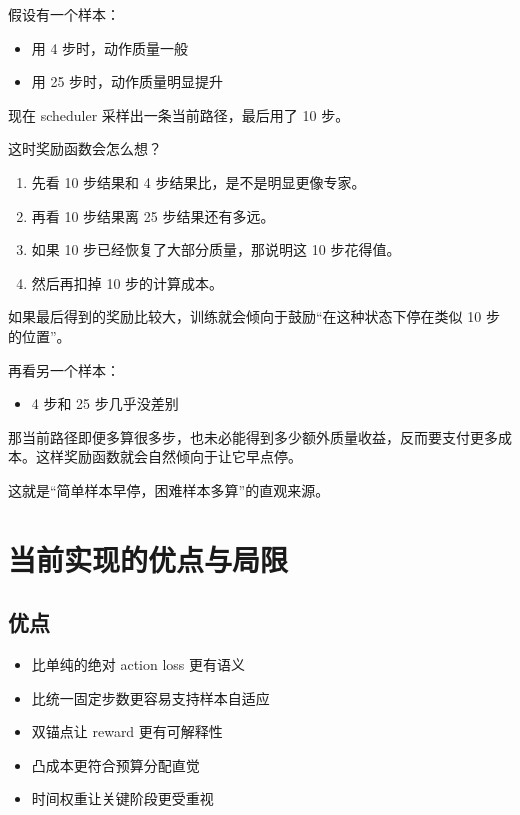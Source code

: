 \documentclass[12pt]{ctexart}
\begin{document}
假设有一个样本：

\begin{itemize}
    \item 用 4 步时，动作质量一般
    \item 用 25 步时，动作质量明显提升
\end{itemize}

现在 scheduler 采样出一条当前路径，最后用了 10 步。

这时奖励函数会怎么想？

\begin{enumerate}
    \item 先看 10 步结果和 4 步结果比，是不是明显更像专家。
    \item 再看 10 步结果离 25 步结果还有多远。
    \item 如果 10 步已经恢复了大部分质量，那说明这 10 步花得值。
    \item 然后再扣掉 10 步的计算成本。
\end{enumerate}

如果最后得到的奖励比较大，训练就会倾向于鼓励“在这种状态下停在类似 10 步的位置”。

再看另一个样本：

\begin{itemize}
    \item 4 步和 25 步几乎没差别
\end{itemize}

那当前路径即便多算很多步，也未必能得到多少额外质量收益，反而要支付更多成本。这样奖励函数就会自然倾向于让它早点停。

这就是“简单样本早停，困难样本多算”的直观来源。

\section{当前实现的优点与局限}

\subsection{优点}

\begin{itemize}
    \item 比单纯的绝对 action loss 更有语义
    \item 比统一固定步数更容易支持样本自适应
    \item 双锚点让 reward 更有可解释性
    \item 凸成本更符合预算分配直觉
    \item 时间权重让关键阶段更受重视
\end{itemize}
\end{document}
